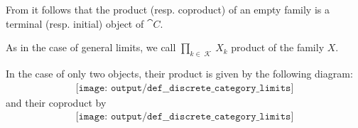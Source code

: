 \begin{definition}
  From  it follows that the product (resp. coproduct) of an empty family is a terminal (resp. initial) object of \( \cat{C} \).

  As in the case of general limits, we call \( \prod_{k \in \mscrK} X_k \)  product of the family \( X \).

  In the case of only two objects, their product is given by the following diagram:
  \begin{equation}\label{eq:def:discrete_category_limits/product/binary}
    \begin{aligned}
      \texttt{[image: output/def\_\_discrete\_category\_limits]}
    \end{aligned}
  \end{equation}
  and their coproduct by
  \begin{equation}\label{eq:def:discrete_category_limits/coproduct/binary}
    \begin{aligned}
      \texttt{[image: output/def\_\_discrete\_category\_limits]}
    \end{aligned}
  \end{equation}
\end{definition}


